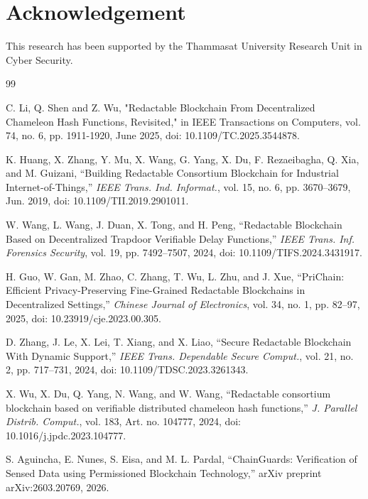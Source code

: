 \documentclass[lettersize,journal]{IEEEtran}
\begin{document}
 \section{Acknowledgement}
    This research has been supported by the Thammasat University Research Unit in Cyber Security.
    
     \begin{thebibliography}{99}
    
    C. Li, Q. Shen and Z. Wu, "Redactable Blockchain From Decentralized Chameleon Hash Functions, Revisited," in IEEE Transactions on Computers, vol. 74, no. 6, pp. 1911-1920, June 2025, doi: 10.1109/TC.2025.3544878.
    
    
    
    
    K. Huang, X. Zhang, Y. Mu, X. Wang, G. Yang, X. Du, F. Rezaeibagha, Q. Xia, and M. Guizani,
    ``Building Redactable Consortium Blockchain for Industrial Internet-of-Things,''
    \textit{IEEE Trans. Ind. Informat.}, vol. 15, no. 6, pp. 3670--3679, Jun. 2019,
    doi: 10.1109/TII.2019.2901011.
    
    W. Wang, L. Wang, J. Duan, X. Tong, and H. Peng,
    ``Redactable Blockchain Based on Decentralized Trapdoor Verifiable Delay Functions,''
    \textit{IEEE Trans. Inf. Forensics Security}, vol. 19, pp. 7492--7507, 2024,
    doi: 10.1109/TIFS.2024.3431917.
    
    H. Guo, W. Gan, M. Zhao, C. Zhang, T. Wu, L. Zhu, and J. Xue,
    ``PriChain: Efficient Privacy-Preserving Fine-Grained Redactable Blockchains in Decentralized Settings,''
    \textit{Chinese Journal of Electronics}, vol. 34, no. 1, pp. 82--97, 2025,
    doi: 10.23919/cje.2023.00.305.
    
    D. Zhang, J. Le, X. Lei, T. Xiang, and X. Liao,
    ``Secure Redactable Blockchain With Dynamic Support,''
    \textit{IEEE Trans. Dependable Secure Comput.}, vol. 21, no. 2, pp. 717--731, 2024,
    doi: 10.1109/TDSC.2023.3261343.
    
    X. Wu, X. Du, Q. Yang, N. Wang, and W. Wang,
    ``Redactable consortium blockchain based on verifiable distributed chameleon hash functions,''
    \textit{J. Parallel Distrib. Comput.}, vol. 183, Art. no. 104777, 2024,
    doi: 10.1016/j.jpdc.2023.104777.
    
    S. Aguincha, E. Nunes, S. Eisa, and M. L. Pardal,
    ``ChainGuards: Verification of Sensed Data using Permissioned Blockchain Technology,''
    arXiv preprint arXiv:2603.20769, 2026.
    

\end{thebibliography}
\end{document}
